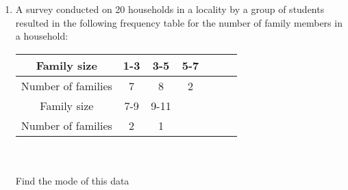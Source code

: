 \renewcommand{\theequation}{\theenumi}
\begin{enumerate}[label=\arabic*.,ref=\thesubsection.\theenumi]
\item A survey conducted on 20 households in a locality by a group of students
resulted in the following frequency table for the number of family members in a
household:\\

\begin{tabular}{|c|c|c|c|c|c|c|}
	\hline
	Family size &1-3&3-5&5-7\\
	\hline
	Number of families &7&8&2\\
	\hline
	Family size &7-9&9-11&\\
	\hline
	Number of families &2&1&\\
	\hline
\end{tabular}\\\\
Find the mode of this data
\end{enumerate}